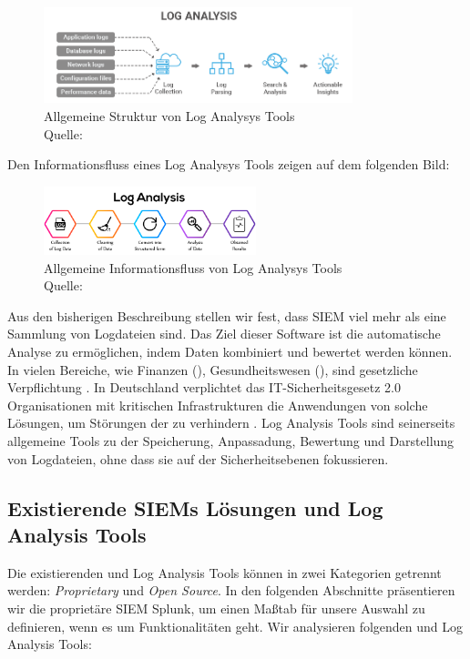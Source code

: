 \begin{figure}[H]
   \centering
   \includegraphics[width=0.8\textwidth]{assets/2.1_p2.png}
   \caption{Allgemeine Struktur von Log Analysys Tools\\Quelle: \citep{Tek-Tools_LGTArchitektur} }
   \centering
\end{figure}

Den Informationsfluss eines Log Analysys Tools zeigen auf dem folgenden Bild:

\begin{figure}[H]
   \centering
   \includegraphics[width=0.55\textwidth]{assets/2.2_p2.png}
   \caption{Allgemeine Informationsfluss von Log Analysys Tools\\Quelle: \citep{Neptune_LATInfoFluss} }
   \centering
\end{figure}

Aus den bisherigen Beschreibung stellen wir fest, dass \gls{SIEM} viel mehr als eine Sammlung von Logdateien sind. Das Ziel dieser Software ist die automatische Analyse zu ermöglichen, indem Daten kombiniert und bewertet werden können. In vielen Bereiche, wie Finanzen (), Gesundheitswesen (), sind  gesetzliche Verpflichtung \citep{Jog_SIEM}. In Deutschland verplichtet das \gls{IT-Sicherheitsgesetz 2.0} Organisationen mit kritischen Infrastrukturen die Anwendungen von solche Lösungen, um Störungen der  zu verhindern \citep{BSI_ITSG}. Log Analysis Tools sind seinerseits allgemeine Tools zu der Speicherung, Anpassadung, Bewertung und Darstellung von Logdateien, ohne dass sie auf der Sicherheitsebenen fokussieren.

\subsection{Existierende SIEMs Lösungen und Log Analysis Tools }
Die existierenden  und Log Analysis Tools können in zwei Kategorien getrennt werden: \textit{\gls{Proprietary}} und \textit{\gls{Open Source}}. In den folgenden Abschnitte präsentieren wir die proprietäre \gls{SIEM} Splunk, um einen Maßtab für unsere Auswahl zu definieren, wenn es um Funktionalitäten geht. Wir analysieren folgenden  und Log Analysis Tools:

